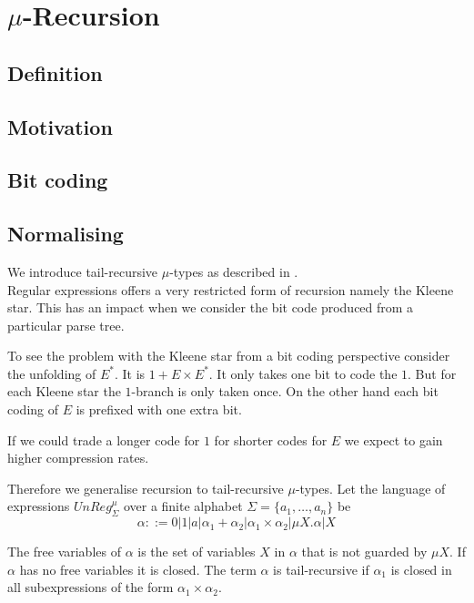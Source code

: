 \documentclass[a4paper, oneside]{memoir}
\theoremstyle{definition}
\begin{document}
\section{$\mu$-Recursion}

\subsection{Definition}

\subsection{Motivation}

\subsection{Bit coding}

\subsection{Normalising}

We introduce tail-recursive $\mu$-types as described in \cite{heni10}.\\[1em]

Regular expressions offers a very restricted form of recursion namely the Kleene
star. This has an impact when we consider the bit code produced from a
particular parse tree.

To see the problem with the Kleene star from a bit coding perspective consider
the unfolding of $E^{\ast}$. It is $1 + E \times E^{\ast}$. It only takes one
bit to code the $1$. But for each Kleene star the $1$-branch is only taken
once. On the other hand each bit coding of $E$ is prefixed with one extra
bit.

If we could trade a longer code for $1$ for shorter codes for $E$ we expect to
gain higher compression rates.

Therefore we generalise recursion to tail-recursive $\mu$-types. Let the
language of expressions $UnReg_{\Sigma}^{\mu}$ over a finite alphabet $\Sigma =
\{a_1, \ldots, a_n\}$ be
\[
\alpha ::= 0 | 1 | a | \alpha_1 + \alpha_2 | \alpha_1 \times \alpha_2 | \mu
X. \alpha | X
\]

The free variables of $\alpha$ is the set of variables $X$ in $\alpha$ that is
not guarded by $\mu X$. If $\alpha$ has no free variables it is closed. The term
$\alpha$ is tail-recursive if $\alpha_1$ is closed in all subexpressions of the
form $\alpha_1 \times \alpha_2$.
\end{document}
